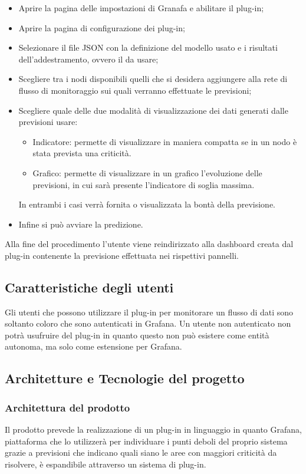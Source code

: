 \documentclass[../analisi-dei-requisiti.tex]{subfiles}
\begin{document}
	\begin{itemize}
		\item{Aprire la pagina delle impostazioni di Granafa e abilitare il plug-in;}
		\item{Aprire la pagina di configurazione dei plug-in;}
		\item{Selezionare il file JSON con la definizione del modello usato e i risultati dell'addestramento, ovvero il  da usare;}
		\item{Scegliere tra i nodi disponibili quelli che si desidera aggiungere alla rete di flusso di monitoraggio sui quali verranno effettuate le previsioni;}
		\item{Scegliere quale delle due modalità di visualizzazione dei dati generati dalle previsioni usare:}
		\begin{itemize}
			\item{Indicatore: permette di visualizzare in maniera compatta se in un nodo è stata prevista una criticità.}
			\item{Grafico: permette di visualizzare in un grafico l'evoluzione delle previsioni, in cui sarà presente l'indicatore di soglia massima.}
		\end{itemize}
		In entrambi i casi verrà fornita o visualizzata la bontà della previsione.
		\item{Infine si può avviare la predizione.}
	\end{itemize}
	Alla fine del procedimento l'utente viene reindirizzato alla dashboard creata dal plug-in contenente la previsione effettuata nei rispettivi pannelli.

\subsection{Caratteristiche degli utenti}
\label{subs:caratteristiche_degli_utenti}
  Gli utenti che possono utilizzare il plug-in per monitorare un flusso di dati sono soltanto coloro che sono autenticati in Grafana. Un utente non autenticato non potrà usufruire del plug-in in quanto questo non può esistere come entità autonoma, ma solo come estensione per Grafana.

\subsection{Architetture e Tecnologie del progetto}
\label{subs:architetture_e_tecnologie_del_progetto}

	\subsubsection{Architettura del prodotto}
	\label{sssec:architettura_del_prodotto}
		Il prodotto prevede la realizzazione di un plug-in in linguaggio  in quanto Grafana, piattaforma che lo utilizzerà per individuare i punti deboli del proprio sistema grazie a previsioni che indicano quali siano le aree con maggiori criticità da risolvere, è espandibile attraverso un sistema di plug-in.
\end{document}
